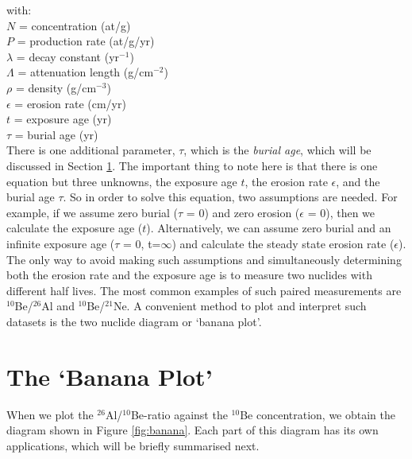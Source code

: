 with:\\

$N$ = concentration (at/g)\\
\indent $P$ = production rate (at/g/yr)\\
\indent $\lambda$ = decay constant (yr$^{-1}$)\\
\indent $\Lambda$ = attenuation length (g/cm$^{-2}$)\\
\indent $\rho$ = density (g/cm$^{-3}$)\\
\indent $\epsilon$ = erosion rate (cm/yr)\\
\indent $t$ = exposure age (yr)\\
\indent $\tau$ = burial age (yr)\\

There is one additional parameter, $\tau$, which is the \emph{burial
  age}, which will be discussed in Section \ref{sec:banana}. The
important thing to note here is that there is one equation but three
unknowns, the exposure age $t$, the erosion rate $\epsilon$, and the
burial age $\tau$. So in order to solve this equation, two assumptions
are needed. For example, if we assume zero burial ($\tau$ = 0) and
zero erosion ($\epsilon$ = 0), then we calculate the exposure age
($t$). Alternatively, we can assume zero burial and an infinite
exposure age ($\tau$ = 0, t=$\infty$) and calculate the steady state
erosion rate ($\epsilon$). The only way to avoid making such
assumptions and simultaneously determining both the erosion rate and
the exposure age is to measure two nuclides with different half
lives. The most common examples of such paired measurements are
$^{10}$Be/$^{26}$Al and $^{10}$Be/$^{21}$Ne. A convenient method to
plot and interpret such datasets is the two nuclide diagram or `banana
plot'.

\section{The `Banana Plot'}
\label{sec:banana}

When we plot the $^{26}$Al/$^{10}$Be-ratio against the $^{10}$Be
concentration, we obtain the diagram shown in Figure \ref{fig:banana}.
Each part of this diagram has its own applications, which will be
briefly summarised next.\\

